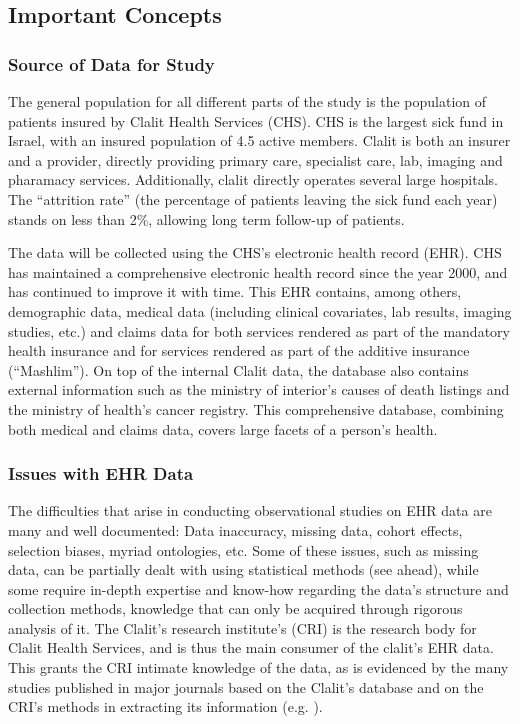 \documentclass[a4paper,12pt]{article}
\begin{document}
	\subsection{Important Concepts}
	
		\subsubsection{Source of Data for Study}
		The general population for all different parts of the study is the population of patients insured by Clalit Health Services (CHS). CHS is the largest sick fund in Israel, with an insured population of 4.5 active members. Clalit is both an insurer and a provider, directly providing primary care, specialist care, lab, imaging and pharamacy services. Additionally, clalit directly operates several large hospitals. The “attrition rate” (the percentage of patients leaving the sick fund each year) stands on less than 2\%, allowing long term follow-up of patients.
		
		The data will be collected using the CHS's electronic health record (EHR). CHS has maintained a comprehensive electronic health record since the year 2000, and has continued to improve it with time. This EHR contains, among others, demographic data, medical data (including clinical covariates, lab results, imaging studies, etc.) and claims data for both services rendered as part of the mandatory health insurance and for services rendered as part of the additive insurance (“Mashlim”). On top of the internal Clalit data, the database also contains external information such as the ministry of interior's causes of death listings and the ministry of health's cancer registry. This comprehensive database, combining both medical and claims data, covers large facets of a person's health.
		
		\subsubsection{Issues with EHR Data}
		The difficulties that arise in conducting observational studies on EHR data are many and well documented: Data inaccuracy, missing data, cohort effects, selection biases, myriad ontologies, etc\cite{Hripcsak2011,Jensen2012,Goldstein2017}. Some of these issues, such as missing data, can be partially dealt with using statistical methods (see ahead), while some require in-depth expertise and know-how regarding the data's structure and collection methods, knowledge that can only be acquired through rigorous analysis of it. The Clalit's research institute's (CRI) is the research body for Clalit Health Services, and is thus the main consumer of the clalit's EHR data. This grants the CRI intimate knowledge of the data, as is evidenced by the many studies published in major journals based on the Clalit's database and on the CRI's methods in extracting its information (e.g. \cite{Reges2018,Dagan2017}).
		
\end{document}
